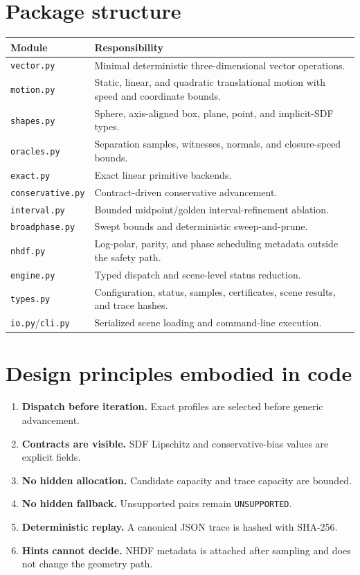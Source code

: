 \documentclass[11pt,a4paper,openany]{book}
\newcommand{\status}[1]{\texttt{#1}}
\begin{document}
\section{Package structure}
\begin{tabularx}{\textwidth}{@{}L{0.26\textwidth}Y@{}}
\toprule
Module & Responsibility \\
\midrule
\texttt{vector.py} & Minimal deterministic three-dimensional vector operations. \\
\texttt{motion.py} & Static, linear, and quadratic translational motion with speed and coordinate bounds. \\
\texttt{shapes.py} & Sphere, axis-aligned box, plane, point, and implicit-SDF types. \\
\texttt{oracles.py} & Separation samples, witnesses, normals, and closure-speed bounds. \\
\texttt{exact.py} & Exact linear primitive backends. \\
\texttt{conservative.py} & Contract-driven conservative advancement. \\
\texttt{interval.py} & Bounded midpoint/golden interval-refinement ablation. \\
\texttt{broadphase.py} & Swept bounds and deterministic sweep-and-prune. \\
\texttt{nhdf.py} & Log-polar, parity, and phase scheduling metadata outside the safety path. \\
\texttt{engine.py} & Typed dispatch and scene-level status reduction. \\
\texttt{types.py} & Configuration, status, samples, certificates, scene results, and trace hashes. \\
\texttt{io.py}/\texttt{cli.py} & Serialized scene loading and command-line execution. \\
\bottomrule
\end{tabularx}

\section{Design principles embodied in code}
\begin{enumerate}
  \item \textbf{Dispatch before iteration.} Exact profiles are selected before generic advancement.
  \item \textbf{Contracts are visible.} SDF Lipschitz and conservative-bias values are explicit fields.
  \item \textbf{No hidden allocation.} Candidate capacity and trace capacity are bounded.
  \item \textbf{No hidden fallback.} Unsupported pairs remain \status{UNSUPPORTED}.
  \item \textbf{Deterministic replay.} A canonical JSON trace is hashed with SHA-256.
  \item \textbf{Hints cannot decide.} NHDF metadata is attached after sampling and does not change the geometry path.
\end{enumerate}
\end{document}
